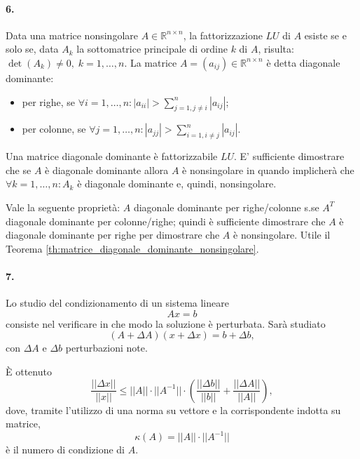 \paragraph{6.} Data una matrice nonsingolare $A\in\mathbb R^{n\times n}$, la fattorizzazione $LU$ di $A$ esiste se e solo se, data $A_k$ la sottomatrice principale di ordine $k$ di $A$, risulta: $\det(A_k)\neq 0,\; k=1,\hdots, n.$ La matrice $A=(a_{ij})\in\mathbb R^{n\times n}$ è detta diagonale dominante:
\begin{itemize}
    \item per righe, se $\forall i=1,\hdots, n: |a_{ii}|>\sum_{j=1, j\neq i}^n|a_{ij}|$;
    \item per colonne, se $\forall j=1,\hdots, n: |a_{jj}|>\sum_{i=1, i\neq j}^n |a_{ij}|$.
\end{itemize}
Una matrice diagonale dominante è fattorizzabile $LU$. E' sufficiente dimostrare che se $A$ è diagonale dominante allora $A$ è nonsingolare in quando implicherà che $\forall k=1,\hdots, n: A_k$ è diagonale dominante e, quindi, nonsingolare.

Vale la seguente proprietà: $A$ diagonale dominante per righe/colonne s.se $A^T$ diagonale dominante per colonne/righe; quindi è sufficiente dimostrare che $A$ è diagonale dominante per righe per dimostrare che $A$ è nonsingolare. Utile il Teorema \ref{th:matrice_diagonale_dominante_nonsingolare}.

\paragraph{7.} Lo studio del condizionamento di un sistema lineare
\begin{equation*}
    Ax=b
\end{equation*}
consiste nel verificare in che modo la soluzione è perturbata. Sarà studiato
\begin{equation*}
    (A+\Delta A)(x+\Delta x) = b + \Delta b,
\end{equation*}
con $\Delta A$ e $\Delta b$ perturbazioni note.

È ottenuto
\begin{equation*}
    \frac{||\Delta x||}{||x||}\leq ||A||\cdot||A^{-1}||\cdot\left(\frac{||\Delta b||}{||b||} + \frac{||\Delta A||}{||A||}\right),
\end{equation*}
dove, tramite l'utilizzo di una norma su vettore e la corrispondente indotta su matrice,
\begin{equation*}
    \kappa(A)=||A||\cdot ||A^{-1}||
\end{equation*}
è il numero di condizione di $A$.

